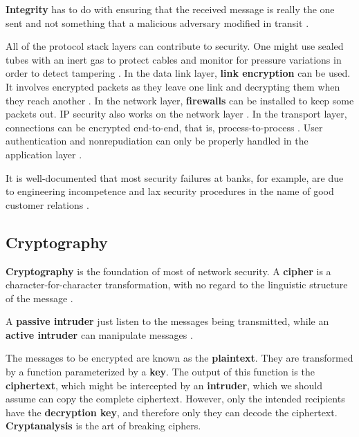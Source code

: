 \textbf{Integrity} has to do with ensuring that the received message is really the one sent and not something that a malicious adversary modified in transit \cite[p.~764]{computer-networks-tanenbaum-2012}.

All of the protocol stack layers can contribute to security. One might use sealed tubes with an inert gas to protect cables and monitor for pressure variations in order to detect tampering \cite[p.~765]{computer-networks-tanenbaum-2012}. In the data link layer, \textbf{link encryption} can be used. It involves encrypted packets as they leave one link and decrypting them when they reach another \cite[p.~765]{computer-networks-tanenbaum-2012}.
In the network layer, \textbf{firewalls} can be installed to keep some packets out. IP security also works on the network layer \cite[p.~765]{computer-networks-tanenbaum-2012}.
In the transport layer, connections can be encrypted end-to-end, that is, process-to-process \cite[p.~765]{computer-networks-tanenbaum-2012}.
User authentication and nonrepudiation can only be properly handled in the application layer \cite[p.~765]{computer-networks-tanenbaum-2012}.

It is well-documented that most security failures at banks, for example, are due to engineering incompetence and lax security procedures in the name of good customer relations \cite[p.~765]{computer-networks-tanenbaum-2012}.

\subsection{Cryptography}

\textbf{Cryptography} is the foundation of most of network security.
A \textbf{cipher} is a character-for-character transformation, with no regard to the linguistic structure of the message \cite[p.~766]{computer-networks-tanenbaum-2012}.

A \textbf{passive intruder} just listen to the messages being transmitted, while an \textbf{active intruder} can manipulate messages \cite[p.~767]{computer-networks-tanenbaum-2012}.

The messages to be encrypted are known as the \textbf{plaintext}. They are transformed by a function parameterized by a \textbf{key}.
The output of this function is the \textbf{ciphertext}, which might be intercepted by an \textbf{intruder}, which we should assume can copy the complete ciphertext.
However, only the intended recipients have the \textbf{decryption key}, and therefore only they can decode the ciphertext.
\textbf{Cryptanalysis} is the art of breaking ciphers.

